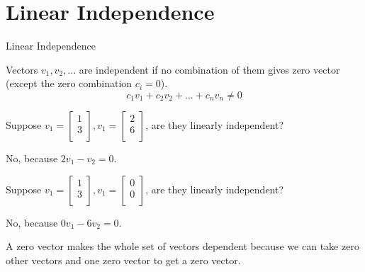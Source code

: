 \documentclass{beamer}
\begin{document}
\section{Linear Independence}
\begin{frame}{Linear Independence}
\begin{definition}
Vectors $v_1, v_2, ...$ are independent if no combination of them gives zero vector (except the zero combination $c_i=0$).
\vspace{-8pt}
\begin{equation*}
    c_1v_1+c_2v_2+...+c_nv_n\ne0
\end{equation*}
\end{definition}

Suppose $v_1=\left[ \begin{array}{c}
	1\\
	3\\
\end{array} \right], v_1=\left[ \begin{array}{c}
	2\\
	6\\
\end{array} \right]$, are they linearly independent?

No, because $2v_1-v_2=0$.

\vspace{5pt}
Suppose $v_1=\left[ \begin{array}{c}
	1\\
	3\\
\end{array} \right], v_1=\left[ \begin{array}{c}
	0\\
	0\\
\end{array} \right]$, are they linearly independent?

No, because $0v_1-6v_2=0$.

\vspace{3pt} A zero vector makes the whole set of vectors dependent because we can take zero other vectors and one zero vector to get a zero vector.
\end{frame}
\end{document}
